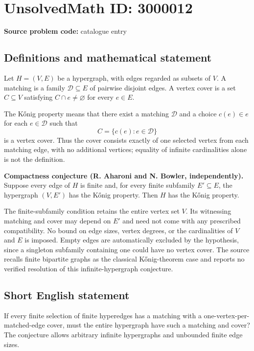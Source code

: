 \documentclass[11pt]{article}
\begin{document}
\section*{UnsolvedMath ID: 3000012}
\textbf{Source problem code:} catalogue entry
\subsection{Definitions and mathematical statement}
Let $H=(V,E)$ be a hypergraph, with edges regarded as subsets of $V$. A matching is a family $\mathcal D\subseteq E$ of pairwise disjoint edges. A vertex cover is a set $C\subseteq V$ satisfying $C\cap e\ne\varnothing$ for every $e\in E$.

The K\H{o}nig property means that there exist a matching $\mathcal D$ and a choice $c(e)\in e$ for each $e\in\mathcal D$ such that
\[
C=\{c(e):e\in\mathcal D\}
\]
is a vertex cover. Thus the cover consists exactly of one selected vertex from each matching edge, with no additional vertices; equality of infinite cardinalities alone is not the definition.

\textbf{Compactness conjecture (R. Aharoni and N. Bowler, independently).} Suppose every edge of $H$ is finite and, for every finite subfamily $E'\subseteq E$, the hypergraph $(V,E')$ has the K\H{o}nig property. Then $H$ has the K\H{o}nig property.

The finite-subfamily condition retains the entire vertex set $V$. Its witnessing matching and cover may depend on $E'$ and need not come with any prescribed compatibility. No bound on edge sizes, vertex degrees, or the cardinalities of $V$ and $E$ is imposed. Empty edges are automatically excluded by the hypothesis, since a singleton subfamily containing one could have no vertex cover. The source recalls finite bipartite graphs as the classical K\H{o}nig-theorem case and reports no verified resolution of this infinite-hypergraph conjecture.
\subsection{Short English statement}
If every finite selection of finite hyperedges has a matching with a one-vertex-per-matched-edge cover, must the entire hypergraph have such a matching and cover? The conjecture allows arbitrary infinite hypergraphs and unbounded finite edge sizes.
\end{document}
